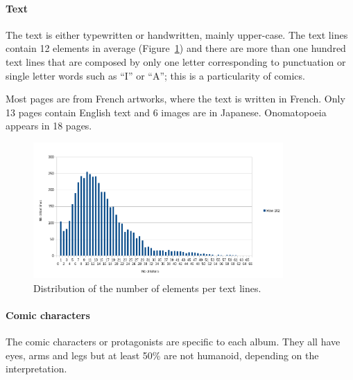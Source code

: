 
\paragraph{Text} %
\label{par:text}
The text is either typewritten or handwritten, mainly upper-case. %
The text lines contain 12 elements in average (Figure~\ref{fig:ex:textline_lenth_distribution}) and there are more than one hundred text lines that are composed by only one letter corresponding to punctuation or single letter words such as ``I'' or ``A''; this is a particularity of comics.

Most pages are from French artworks, where the text is written in French.
Only 13 pages contain English text and 6 images are in Japanese.
Onomatopoeia appears in 18 pages.

    \begin{figure}[ht]%
      \centering
      \includegraphics[trim= 0px 5px 65px 5px, clip, width=0.85\textwidth]{number_of_letter_per_textline.png}
      \caption[Distribution of the number of elements per text lines]{Distribution of the number of elements per text lines.
      }
      \label{fig:ex:textline_lenth_distribution}
    \end{figure}  


\paragraph{Comic characters} %
\label{par:comic_characters}
The comic characters or protagonists are specific to each album.
They all have eyes, arms and legs but at least 50\% are not humanoid, depending on the interpretation.

